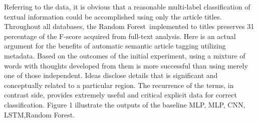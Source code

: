 \documentclass[a4paper]{article}
\begin{document}
Referring to the data, it is obvious that a reasonable multi-label classification of textual information could be accomplished using only the article titles. Throughout all databases, the Random Forest implemented to titles preserves 31 percentage of the F-score acquired from full-text analysis. Here is an actual argument for the benefits of automatic semantic article tagging utilizing metadata. Based on the outcomes of the initial experiment, using a mixture of words with thoughts developed from them is more successful than using merely one of those independent. Ideas disclose details that is significant and conceptually related to a particular region. The recurrence of the terms, in contrast side, provides extremely useful and critical explicit data for correct classification.
Figure 1 illustrate the outputs of the baseline MLP, MLP, CNN, LSTM,Random Forest.

\eightpt


	
\end{document}
